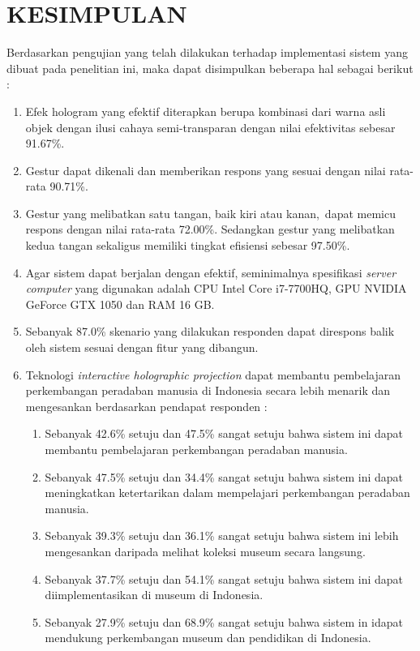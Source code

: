 \documentclass[conference]{IEEEtran}
\begin{document}
\section{KESIMPULAN}
	Berdasarkan pengujian yang telah dilakukan terhadap implementasi sistem yang dibuat pada penelitian ini, maka dapat disimpulkan beberapa hal sebagai berikut :
	\begin{enumerate}
		\item Efek hologram yang efektif diterapkan berupa kombinasi dari warna asli objek dengan ilusi cahaya semi-transparan dengan nilai efektivitas sebesar 91.67\%.
		\item Gestur dapat dikenali dan memberikan respons yang sesuai dengan nilai rata-rata 90.71\%.
		\item Gestur yang melibatkan satu tangan, baik kiri atau kanan, dapat memicu respons dengan nilai rata-rata 72.00\%. Sedangkan gestur yang melibatkan kedua tangan sekaligus memiliki tingkat efisiensi sebesar 97.50\%.
		\item Agar sistem dapat berjalan dengan efektif, seminimalnya spesifikasi \textit{server computer} yang digunakan adalah CPU Intel Core i7-7700HQ, GPU NVIDIA GeForce GTX 1050 dan RAM 16 GB.
		\item Sebanyak 87.0\% skenario yang dilakukan responden dapat direspons balik oleh sistem sesuai dengan fitur yang dibangun. 
		\item Teknologi \textit{interactive holographic projection} dapat membantu pembelajaran perkembangan peradaban manusia di Indonesia secara lebih menarik dan mengesankan berdasarkan pendapat responden :
		\begin{enumerate}
			\item Sebanyak 42.6\% setuju dan 47.5\% sangat setuju bahwa sistem ini dapat membantu pembelajaran perkembangan peradaban manusia.
			\item Sebanyak 47.5\% setuju dan 34.4\% sangat setuju bahwa sistem ini dapat meningkatkan ketertarikan dalam mempelajari perkembangan peradaban manusia.
			\item Sebanyak 39.3\% setuju dan 36.1\% sangat setuju bahwa sistem ini lebih mengesankan daripada melihat koleksi museum secara langsung.
			\item Sebanyak 37.7\% setuju dan 54.1\% sangat setuju bahwa sistem ini dapat diimplementasikan di museum di Indonesia.
			\item Sebanyak 27.9\% setuju dan 68.9\% sangat setuju bahwa sistem in idapat mendukung perkembangan museum dan pendidikan di Indonesia.
		\end{enumerate}
	\end{enumerate}
		
\def\refname{DAFTAR PUSTAKA}


\vspace{12pt}	
\end{document}
